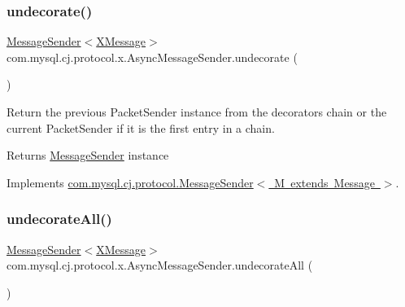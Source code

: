 \subsubsection{\texorpdfstring{undecorate()}{undecorate()}}
{\footnotesize\ttfamily \mbox{\hyperlink{interfacecom_1_1mysql_1_1cj_1_1protocol_1_1_message_sender}{Message\+Sender}}$<$\mbox{\hyperlink{classcom_1_1mysql_1_1cj_1_1protocol_1_1x_1_1_x_message}{X\+Message}}$>$ com.\+mysql.\+cj.\+protocol.\+x.\+Async\+Message\+Sender.\+undecorate (\begin{DoxyParamCaption}{ }\end{DoxyParamCaption})}

Return the previous Packet\+Sender instance from the decorators chain or the current Packet\+Sender if it is the first entry in a chain.

\begin{DoxyReturn}{Returns}
\mbox{\hyperlink{interfacecom_1_1mysql_1_1cj_1_1protocol_1_1_message_sender}{Message\+Sender}} instance 
\end{DoxyReturn}


Implements \mbox{\hyperlink{interfacecom_1_1mysql_1_1cj_1_1protocol_1_1_message_sender_a3a352bf35ad98dc6cea7c1f4ac9480da}{com.\+mysql.\+cj.\+protocol.\+Message\+Sender$<$ M extends Message $>$}}.

\mbox{\label{classcom_1_1mysql_1_1cj_1_1protocol_1_1x_1_1_async_message_sender_ad00ea2b9a6d74feb32a301410fc829f0}} 
\subsubsection{\texorpdfstring{undecorate\+All()}{undecorateAll()}}
{\footnotesize\ttfamily \mbox{\hyperlink{interfacecom_1_1mysql_1_1cj_1_1protocol_1_1_message_sender}{Message\+Sender}}$<$\mbox{\hyperlink{classcom_1_1mysql_1_1cj_1_1protocol_1_1x_1_1_x_message}{X\+Message}}$>$ com.\+mysql.\+cj.\+protocol.\+x.\+Async\+Message\+Sender.\+undecorate\+All (\begin{DoxyParamCaption}{ }\end{DoxyParamCaption})}

